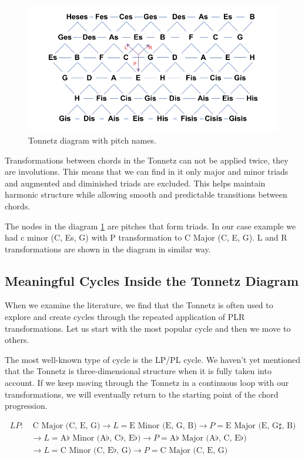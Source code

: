 \begin{figure}[H]
    \centering
    \includegraphics[scale=0.8]{obrazky-figures/tonnetz.pdf}
    \caption{Tonnetz diagram with pitch names.}
    \label{fig:tonnetz}
\end{figure}

Transformations between chords in the Tonnetz can not be applied twice, they are involutions. This means that we can find in it only major and minor triads and augmented and diminished triads are excluded. This helps maintain harmonic structure while allowing smooth and predictable transitions between chords.

The nodes in the diagram \ref{fig:tonnetz} are pitches that form triads. In our case example we had c minor (C, Es, G) with P transformation to C Major (C, E, G). L and R transformations are shown in the diagram in similar way.

\subsection*{Meaningful Cycles Inside the Tonnetz Diagram}
When we examine the literature, we find that the Tonnetz is often used to explore and create cycles through the repeated application of PLR transformations. Let us start with the most popular cycle and then we move to others.

The most well-known type of cycle is the LP/PL cycle. We haven’t yet mentioned that the Tonnetz is three-dimensional structure when it is fully taken into account. If we keep moving through the Tonnetz in a continuous loop with our transformations, we will eventually return to the starting point of the chord progression. 

\[
\begin{aligned}
LP: & \ \text{C Major (C, E, G)} \rightarrow L = \text{E Minor (E, G, B)} \rightarrow P = \text{E Major (E, G$\sharp$, B)} \\
    & \rightarrow L = \text{A$\flat$ Minor (A$\flat$, C$\flat$, E$\flat$)} \rightarrow P = \text{A$\flat$ Major (A$\flat$, C, E$\flat$)} \\
    & \rightarrow L = \text{C Minor (C, E$\flat$, G)} \rightarrow P = \text{C Major (C, E, G)}
\end{aligned}
\]

